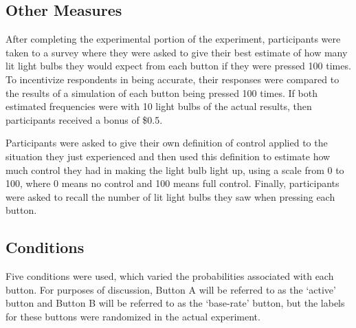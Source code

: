 \documentclass[USenglish,letterpaper,12pt,extrafontsizes,oneside,onecolumn,final]{memoir}
\begin{document}
\subsection{Other Measures}

After completing the experimental portion of the experiment, participants were taken to a survey where they were asked to give their best estimate of how many lit light bulbs they would expect from each button if they were pressed 100 times.  To incentivize respondents in being accurate, their responses were compared to the results of a simulation of each button being pressed 100 times.  If both estimated frequencies were with 10 light bulbs of the actual results, then participants received a bonus of \$0.5.  

Participants were asked to give their own definition of control applied to the situation they just experienced and then used this definition to estimate how much control they had in making the light bulb light up, using a scale from 0 to 100, where 0 means no control and 100 means full control. Finally, participants were asked to recall the number of lit light bulbs they saw when pressing each button.  

\subsection{Conditions}

Five conditions were used, which varied the probabilities associated with each button.  For purposes of discussion, Button A will be referred to as the `active' button and Button B will be referred to as the `base-rate' button, but the labels for these buttons were randomized in the actual experiment. 

\end{document}
